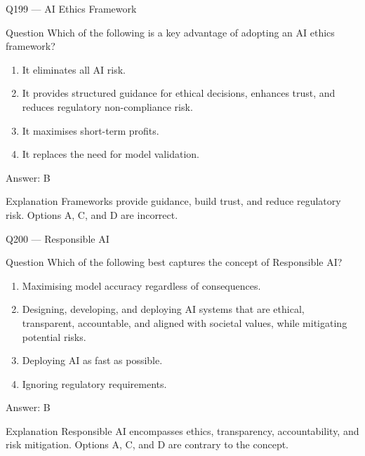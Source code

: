 \documentclass[aspectratio=169,8pt]{beamer}
\begin{document}
							\begin{frame}{Q199 --- AI Ethics Framework}
								\begin{block}{Question}
									Which of the following is a key advantage of adopting an AI ethics framework?
									\begin{enumerate}
										\item It eliminates all AI risk.
										\item It provides structured guidance for ethical decisions, enhances trust, and reduces regulatory non-compliance risk.
										\item It maximises short-term profits.
										\item It replaces the need for model validation.
									\end{enumerate}  \end{block}
									\begin{exampleblock}{Answer: B}\end{exampleblock}
									\begin{block}{Explanation}
										Frameworks provide guidance, build trust, and reduce regulatory risk. Options A, C, and D are incorrect.
									\end{block}
								\end{frame}
								
								\begin{frame}{Q200 --- Responsible AI}
									\begin{block}{Question}
										Which of the following best captures the concept of Responsible AI?
										\begin{enumerate}
											\item Maximising model accuracy regardless of consequences.
											\item Designing, developing, and deploying AI systems that are ethical, transparent, accountable, and aligned with societal values, while mitigating potential risks.
											\item Deploying AI as fast as possible.
											\item Ignoring regulatory requirements.
										\end{enumerate}  \end{block}
										\begin{exampleblock}{Answer: B}\end{exampleblock}
										\begin{block}{Explanation}
											Responsible AI encompasses ethics, transparency, accountability, and risk mitigation. Options A, C, and D are contrary to the concept.
										\end{block}
									\end{frame}
									
\end{document}
